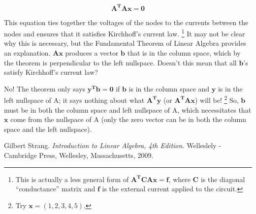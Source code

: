 \documentclass[11pt]{article} %
\begin{document}
\[
\bm{A^TAx} = \bm{0}
\]

This equation ties together the voltages of the nodes to the currents
between the nodes and ensures that it satisfies Kirchhoff's current
law. \footnote{This is actually a less general form of $\bm{A^TCAx} =
  \bm{f}$, where $\bm{C}$ is the diagonal ``conductance'' matrix and
  $\bm{f}$ is the external current applied to the circuit.}  It may
not be clear why this is necessary, but the Fundamental Theorem of
Linear Algebra provides an explanation.  $\bm{Ax}$ produces a vector
$\bm{b}$ that is in the column space, which by the theorem is
perpendicular to the left nullspace.  Doesn't this mean that all
$\bm{b}$'s satisfy Kirchhoff's current law?

No!  The theorem only says $\bm{y^Tb} = \bm{0}$ if $\bm{b}$ is in the
column space and $\bm{y}$ is in the left nullspace of A; it says
nothing about what $\bm{A^Ty}$ (or $\bm{A^TAx}$) will
be! \footnote{Try $\bm{x} = (1, 2, 3, 4, 5)$.}  So, $\bm{b}$ must be
in both the column space and left nullspace of A, which necessitates
that $\bm{x}$ come from the nullspace of A (only the zero vector can
be in both the column space and the left nullspace).

\begin{thebibliography}{9}
  Gilbert Strang.
  \textit{Introduction to Linear Algebra, 4th Edition.}
  Welleslely - Cambridge Press, Wellesley, Massachusetts, 2009.
\end{thebibliography}
\end{document}
